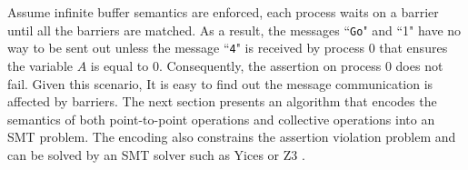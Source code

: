 Assume infinite buffer semantics are enforced, each process waits on a barrier until all the barriers are matched. As a result, the messages ``\texttt{Go}" and ``1" have no way to be sent out unless the message ``\texttt{4}" is received by process $0$ that ensures the variable $A$ is equal to $0$. Consequently, the assertion on process $0$ does not fail. Given this scenario, It is easy to find out the message communication is affected by barriers. The next section presents an algorithm that encodes the semantics of both point-to-point operations and collective operations into an SMT problem. The encoding also constrains the assertion violation problem and can be solved by an SMT solver such as Yices \cite{dutertre:CAV06} or Z3 \cite{demoura:tacas08}.





